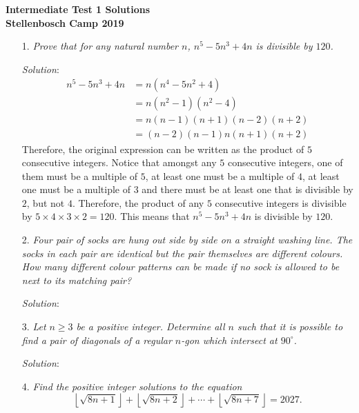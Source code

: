 \documentclass{article}
\begin{document}
\begin{center}
  \textbf{\Large Intermediate Test 1 Solutions}
  \\ \vspace{1em}
  \textbf{\large Stellenbosch Camp 2019}
\end{center}


\begin{enumerate}[1.]

\item[1.] %
\textit{Prove that for any natural number $n$, $n^5-5n^3+4n$ is divisible by $120$. }

\textit{Solution}:
\begin{align*}
  n^5 - 5n^3 + 4n &= n(n^4 - 5n^2 + 4) \\
  &= n(n^2 - 1)(n^2 - 4) \\
  &= n(n - 1)(n + 1)(n - 2)(n + 2) \\
  &= (n - 2)(n - 1)n(n + 1)(n + 2)
\end{align*}
Therefore, the original expression can be written as the product of $5$ consecutive integers. Notice that amongst any $5$ consecutive integers, one of them must be a multiple of $5$, at least one must be a multiple of $4$, at least one must be a multiple of $3$ and there must be at least one that is divisible by $2$, but not $4$.
Therefore, the product of any $5$ consecutive integers is divisible by $5 \times 4 \times 3 \times 2 = 120$. This means that $n^5 - 5n^3 + 4n$ is divisible by $120$.

\item[2.] %
\textit{Four pair of socks are hung out side by side on a straight washing line.
The socks in each pair are identical but the pair themselves are different colours.
How many different colour patterns can be made if no sock is allowed to be next to its matching pair?
}

\textit{Solution}:


\item[3.] %
\textit{Let $n\geq3$ be a positive integer.
Determine all $n$ such that it is possible to find a pair of diagonals of a regular $n$-gon which intersect at $90^\circ$.}

\textit{Solution}:


\item[4.] %
\newcommand{\floorsqrt}[1]{\left\lfloor\sqrt{#1}\right\rfloor} 
\textit{
Find the positive integer solutions to the equation
\[ \floorsqrt{8n+1} +\floorsqrt{8n+2} +\dotsb +\floorsqrt{8n+7} = 2027. \]}


\end{enumerate}
\end{document}
